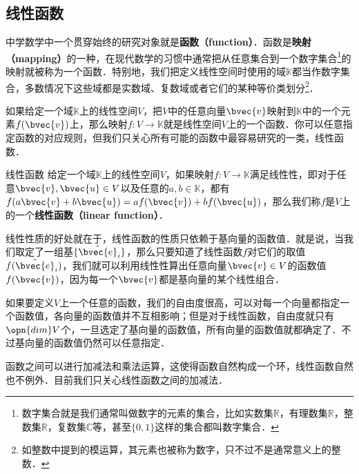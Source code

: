 


\subsection{线性函数}

中学数学中一个贯穿始终的研究对象就是\textbf{函数（function）}．函数是\textbf{映射（mapping）}的一种，在现代数学的习惯中通常把从任意集合到一个数字集合\footnote{数字集合就是我们通常叫做数字的元素的集合，比如实数集$\mathbb{R}$，有理数集$\mathbb{R}$，整数集$\mathbb{R}$，复数集$\mathbb{C}$等，甚至$\{0, 1\}$这样的集合都叫数字集合．}的映射就被称为一个函数．特别地，我们把定义线性空间时使用的域$\mathbb{K}$都当作数字集合，多数情况下这些域都是实数域、复数域或者它们的某种等价类划分\footnote{如整数中提到的模运算，其元素也被称为数字，只不过不是通常意义上的整数．}．

如果给定一个域$\mathbb{K}$上的线性空间$V$，把$V$中的任意向量$\bvec{v}$映射到$\mathbb{K}$中的一个元素$f(\bvec{v})$上，那么映射$f:V\rightarrow\mathbb{K}$就是线性空间$V$上的一个函数．你可以任意指定函数的对应规则，但我们只关心所有可能的函数中最容易研究的一类，线性函数．

\begin{definition}{线性函数}
给定一个域$\mathbb{K}$上的线性空间$V$，如果映射$f:V\rightarrow\mathbb{K}$满足线性性，即对于任意$\bvec{v}, \bvec{u}\in V$以及任意的$a, b\in\mathbb{K}$，都有$f(a\bvec{v}+b\bvec{u})=af(\bvec{v})+bf(\bvec{u})$，那么我们称$f$是$V$上的一个\textbf{线性函数（linear function）}．
\end{definition}

线性性质的好处就在于，线性函数的性质只依赖于基向量的函数值．就是说，当我们取定了一组基$\{\hat{\bvec{e}}_i\}$，那么只要知道了线性函数$f$对它们的取值$f(\hat{\bvec{e}}_i)$，我们就可以利用线性性算出任意向量$\bvec{v}\in V$的函数值$f(\bvec{v})$，因为每一个$\bvec{v}$都是基向量的某个线性组合．

如果要定义$V$上一个任意的函数，我们的自由度很高，可以对每一个向量都指定一个函数值，各向量的函数值并不互相影响；但是对于线性函数，自由度就只有$\opn{dim} V$个，一旦选定了基向量的函数值，所有向量的函数值就都确定了．不过基向量的函数值仍然可以任意指定．

函数之间可以进行加减法和乘法运算，这使得函数自然构成一个环，线性函数自然也不例外．目前我们只关心线性函数之间的加减法．

